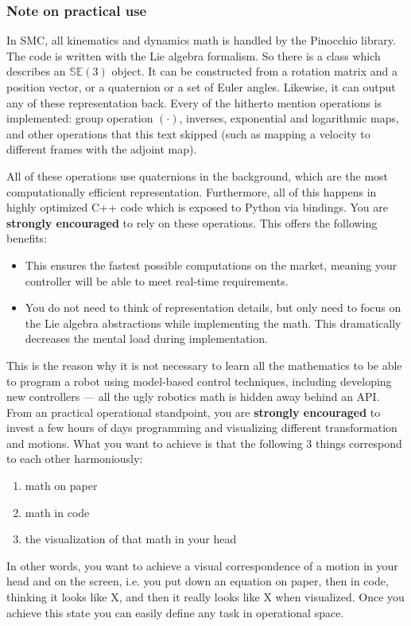 \subsubsection{Note on practical use}
In SMC, all kinematics and dynamics math is handled by the Pinocchio library.
The code is written with the Lie algebra formalism.
So there is a class  which describes an $ \mathbb{SE}(3)  $
object. It can be constructed from a rotation matrix and a position vector,
or a quaternion or a set of Euler angles. Likewise, 
it can output any of these representation back.
Every of the hitherto mention operations is implemented:
group operation $ (\cdot)  $, inverses, exponential and logarithmic maps,
and other operations that this text skipped (such as mapping a velocity to different
frames with the adjoint map).

All of these operations use quaternions in the background,
which are the most computationally efficient representation.
Furthermore, all of this happens in highly optimized C++ code which is exposed
to Python via bindings.
You are \textbf{strongly encouraged} to rely on these operations.
This offers the following benefits:
\begin{itemize}
		\item This ensures the fastest possible computations on the market,
				meaning your controller will be able to meet real-time requirements.
		\item You do not need to think of representation details,
				but only need to focus on the Lie algebra abstractions 
				while implementing the math. This dramatically decreases the
				mental load during implementation.
\end{itemize}

This is the reason why it is not necessary to learn all the mathematics
to be able to program a robot using model-based control techniques, including developing
new controllers --- all the ugly robotics math is hidden away behind an API. 
From an practical operational standpoint, you are \textbf{strongly encouraged}
to invest a few hours of days programming and visualizing different
transformation and motions. What you want to achieve is that the following
3 things correspond to each other harmoniously:
\begin{enumerate}
		\item math on paper
		\item math in code
		\item the visualization of that math in your head
\end{enumerate}
In other words, you want to achieve a visual correspondence of a motion in your head 
and on the screen,
i.e. you put down an equation on paper, then in code, thinking it looks like X,
and then it really looks like X when visualized.
Once you achieve this state you can easily define any task in operational space.

